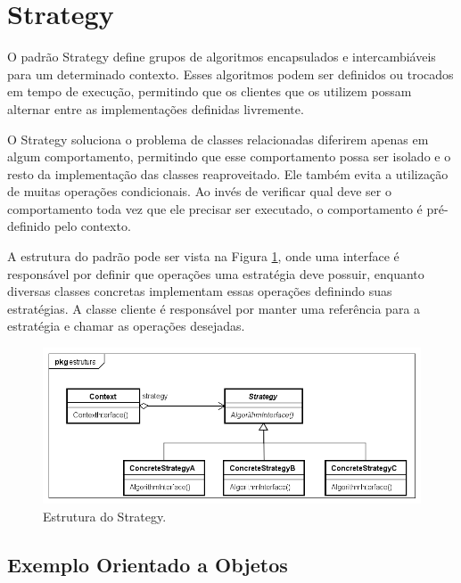 \section{Strategy}


O padrão Strategy define grupos de algoritmos encapsulados e
intercambiáveis para um determinado contexto. Esses 
algoritmos podem ser definidos ou trocados em tempo de 
execução, permitindo que os clientes que os utilizem possam
alternar entre as implementações definidas livremente.
\cite{gamma:1995}

O Strategy soluciona o problema de classes relacionadas 
diferirem apenas em algum comportamento, permitindo que 
esse comportamento possa ser isolado e o resto da implementação 
das classes reaproveitado. Ele também evita a utilização de 
muitas operações condicionais. Ao invés de verificar qual 
deve ser o comportamento toda vez que ele precisar ser 
executado, o comportamento é pré-definido pelo contexto. 

A estrutura do padrão pode ser vista na Figura \ref{strategy_struct}, 
onde uma interface é responsável por definir que operações 
uma estratégia deve possuir, enquanto diversas classes 
concretas implementam essas operações definindo suas 
estratégias. A classe cliente é responsável por manter 
uma referência para a estratégia e chamar as 
operações desejadas.

\begin{figure}[htb]
	\caption{\label{strategy_struct}Estrutura do Strategy.}
	\begin{center}
	    \includegraphics[scale=0.5]{5_padroes-contexto-funcional/5.3_comportamentais/5.3.09_strategy/strategy_estrutura.png}
	\end{center}
\end{figure}

\subsection*{Exemplo Orientado a Objetos}

